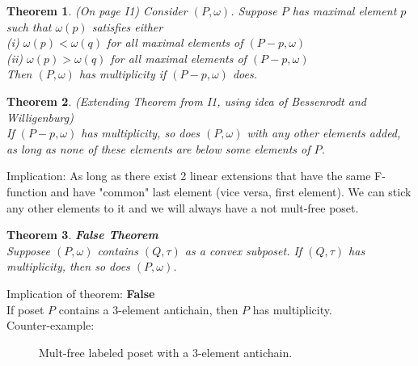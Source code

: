 \documentclass[reqno]{amsart}
\newtheorem{theorem}{Theorem}
\begin{document}
\begin{theorem}
(On page I1) Consider $(P,\omega)$. Suppose $P$ has maximal element $p$ such that $\omega(p)$ satisfies either\\
(i)  $\omega(p) < \omega(q)$ for all maximal elements of $(P-p,\omega)$\\
(ii) $\omega(p) > \omega(q)$ for all maximal elements of $(P-p,\omega)$\\
\vspace{5 mm}
Then $(P,\omega)$ has multiplicity if $(P-p,\omega)$ does.\\
\end{theorem}

\begin{theorem}
(Extending Theorem from I1, using idea of Bessenrodt and Willigenburg)\\
If $(P-p, \omega)$ has multiplicity, so does $(P,\omega)$ with any other elements added, as long as none of these elements are below some elements of $P$.
\end{theorem}

Implication: As long as there exist 2 linear extensions that have the same F-function and have "common" last element (vice versa, first element). We can stick any other elements to it and we will always have a not mult-free poset.

\begin{theorem} \textbf{False Theorem}\\
Supposee $(P,\omega)$ contains $(Q,\tau)$ as a convex subposet. If $(Q,\tau)$ has multiplicity, then so does $(P,\omega)$.
\end{theorem}
Implication of theorem: \textbf{False}\\
If poset $P$ contains a 3-element antichain, then $P$ has multiplicity.\\
\vspace*{5 mm}
Counter-example:

\begin{figure}[htbp]
\begin{center}
\caption{Mult-free labeled poset with a 3-element antichain.}
\label{fig:popartitions}
\end{center}
\end{figure}
\end{document}
